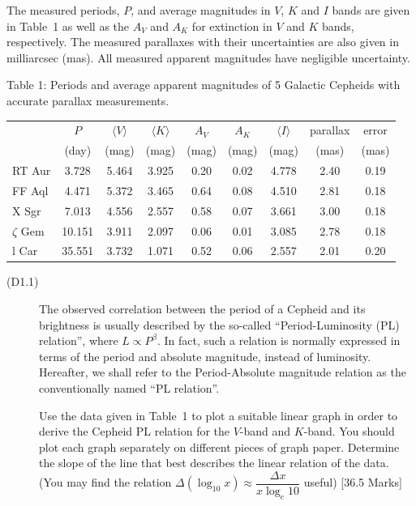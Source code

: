 The measured periods, $P$, and average magnitudes in $V$, $K$ and $I$ bands
are given in Table~1 as well as the $A_V$ and $A_K$ for extinction in $V$ and
$K$ bands, respectively. The measured parallaxes with their uncertainties are
also given in milliarcsec (mas). All measured apparent magnitudes have
negligible uncertainty.

Table 1: Periods and average apparent magnitudes of 5 Galactic Cepheids with
accurate parallax measurements.

\begin{center}
\begin{tabular}{l|c|c|c|c|c|c|c|c}
 & $P$ & $\langle V\rangle$ & $\langle K\rangle$ & $A_V$ & $A_K$
 & $\langle I\rangle$ & parallax & error \\
 & (day) & (mag) & (mag) & (mag) & (mag) & (mag) & (mas) & (mas) \\
\hline
RT Aur      & 3.728  & 5.464 & 3.925 & 0.20 & 0.02 & 4.778 & 2.40 & 0.19 \\
FF Aql      & 4.471  & 5.372 & 3.465 & 0.64 & 0.08 & 4.510 & 2.81 & 0.18 \\
X Sgr       & 7.013  & 4.556 & 2.557 & 0.58 & 0.07 & 3.661 & 3.00 & 0.18 \\
$\zeta$ Gem & 10.151 & 3.911 & 2.097 & 0.06 & 0.01 & 3.085 & 2.78 & 0.18 \\
l Car       & 35.551 & 3.732 & 1.071 & 0.52 & 0.06 & 2.557 & 2.01 & 0.20 \\
\end{tabular}
\end{center}

\begin{description}
\item[(D1.1)] The observed correlation between the period of a Cepheid and its
  brightness is usually described by the so-called ``Period-Luminosity (PL)
  relation'', where $L \propto P^\beta$. In fact, such a relation is normally
  expressed in terms of the period and absolute magnitude, instead of
  luminosity. Hereafter, we shall refer to the Period-Absolute magnitude
  relation as the conventionally named ``PL relation''.

  Use the data given in Table~1 to plot a suitable linear graph in order to
  derive the Cepheid PL relation for the $V$-band and $K$-band. You should
  plot each graph separately on different pieces of graph paper. Determine the
  slope of the line that best describes the linear relation of the data. (You
  may find the relation
  $\Delta(\log_{10} x) \approx \dfrac{\Delta x}{x \log_e 10}$ useful)
  \hfill[36.5 Marks]
\end{description}


